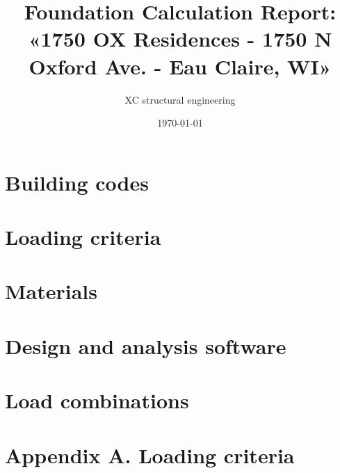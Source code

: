 

\usepackage{array, boldline, makecell, booktabs}
\newcommand\btrule[1]{\specialrule{#1}{0pt}{0pt}}
\usepackage{colortbl}
\usepackage{multicol,caption}               %
\usepackage{xcolor}
\usepackage{hyperref}
\newenvironment{Figure}
  {\par\medskip\noindent\minipage{\linewidth}}
  {\endminipage\par\medskip}

\title{Foundation Calculation Report: «1750 OX Residences - 1750 N Oxford Ave. - Eau Claire, WI» }
\author{XC structural engineering}
\date{\today}
\newcommand{\revision}{0.0}
\newcommand{\titdocum}{Foundation Calculation Report}

\maketitle
\tableofcontents
\listoftables
\listoffigures
\section{Building codes}

\section{Loading criteria}

\section{Materials}

\section{Design and analysis software}

\section{Load combinations}



\clearpage
\appendix
\section{Appendix A. Loading criteria}



